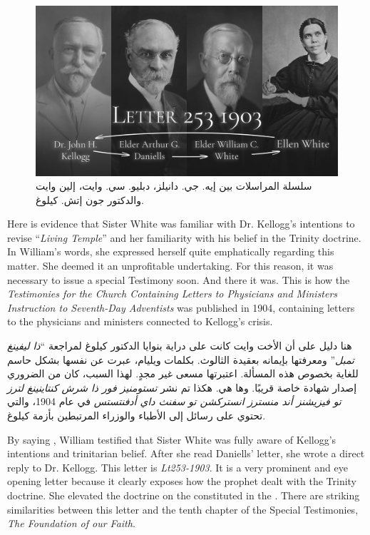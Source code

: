 \begin{figure}[h]
    \centering
    \includegraphics[width=1\linewidth]{images/correspondance.jpg}
    \caption*{سلسلة المراسلات بين إيه. جي. دانيلز، دبليو. سي. وايت، إلين وايت والدكتور جون إتش. كيلوغ.}
    \label{fig:corespondance}
\end{figure}


Here is evidence that Sister White was familiar with Dr. Kellogg's intentions to revise “\textit{Living Temple}” and her familiarity with his belief in the Trinity doctrine. In William's words, she expressed herself quite emphatically regarding this matter. She deemed it an unprofitable undertaking. For this reason, it was necessary to issue a special Testimony soon. And there it was. This is how the \textit{Testimonies for the Church Containing Letters to Physicians and Ministers Instruction to Seventh-Day Adventists} was published in 1904, containing letters to the physicians and ministers connected to Kellogg's crisis.


هنا دليل على أن الأخت وايت كانت على دراية بنوايا الدكتور كيلوغ لمراجعة “\textit{ذا ليفينغ تمبل}” ومعرفتها بإيمانه بعقيدة الثالوث. بكلمات ويليام، عبرت عن نفسها بشكل حاسم للغاية بخصوص هذه المسألة. اعتبرتها مسعى غير مجدٍ. لهذا السبب، كان من الضروري إصدار شهادة خاصة قريبًا. وها هي. هكذا تم نشر \textit{تستومنيز فور ذا شرش كنتاينينغ لترز تو فيزيشنز أند منسترز انستركشن تو سفنث داي أدفنتستس} في عام 1904، والتي تحتوي على رسائل إلى الأطباء والوزراء المرتبطين بأزمة كيلوغ.


By saying , William testified that Sister White was fully aware of Kellogg's intentions and trinitarian belief. After she read Daniells’ letter, she wrote a direct reply to Dr. Kellogg. This letter is \textit{Lt253-1903}. It is a very prominent and eye opening letter because it clearly exposes how the prophet dealt with the Trinity doctrine. She elevated the doctrine on the  constituted in the . There are striking similarities between this letter and the tenth chapter of the Special Testimonies, \textit{The Foundation of our Faith}.


